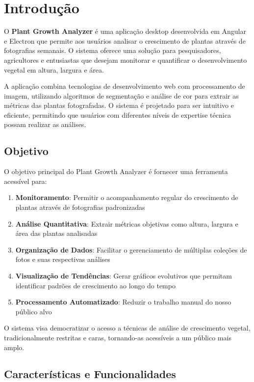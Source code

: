 \chapter{Introdução}

O \textbf{Plant Growth Analyzer} é uma aplicação desktop desenvolvida em Angular e Electron que permite aos usuários analisar o crescimento de plantas através de fotografias semanais. O sistema oferece uma solução para pesquisadores, agricultores e entusiastas que desejam monitorar e quantificar o desenvolvimento vegetal em altura, largura e área.

A aplicação combina tecnologias de desenvolvimento web com processamento de imagem, utilizando algoritmos de segmentação e análise de cor para extrair as métricas das plantas fotografadas. O sistema é projetado para ser intuitivo e eficiente, permitindo que usuários com diferentes níveis de expertise técnica possam realizar as análises.

\section{Objetivo}

O objetivo principal do Plant Growth Analyzer é fornecer uma ferramenta acessível para:

\begin{enumerate}
    \item \textbf{Monitoramento}: Permitir o acompanhamento regular do crescimento de plantas através de fotografias padronizadas
    \item \textbf{Análise Quantitativa}: Extrair métricas objetivas como altura, largura e área das plantas analisadas
    \item \textbf{Organização de Dados}: Facilitar o gerenciamento de múltiplas coleções de fotos e suas respectivas análises
    \item \textbf{Visualização de Tendências}: Gerar gráficos evolutivos que permitam identificar padrões de crescimento ao longo do tempo
    \item \textbf{Processamento Automatizado}: Reduzir o trabalho manual do nosso público alvo
\end{enumerate}

O sistema visa democratizar o acesso a técnicas de análise de crescimento vegetal, tradicionalmente restritas e caras, tornando-as acessíveis a um público mais amplo.

\section{Características e Funcionalidades}

